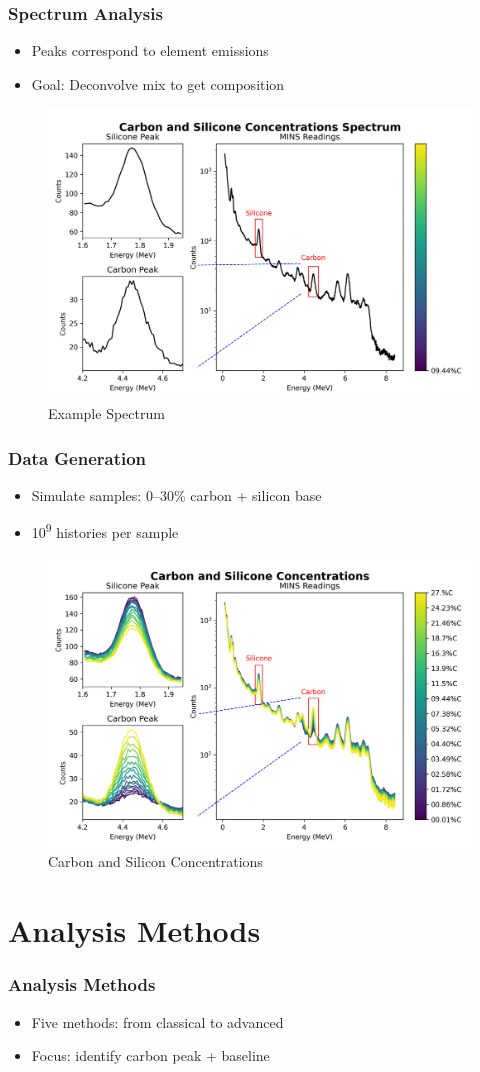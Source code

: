 \documentclass[xcolor=dvipsnames,envcountsect]{beamer}
\begin{document}
\begin{frame}
  \frametitle{Spectrum Analysis}
  \begin{itemize}
    \item Peaks correspond to element emissions
    \item Goal: Deconvolve mix to get composition
  \end{itemize}
  \begin{figure}
      \centering
      \includegraphics[width=.5\linewidth]{Figures/ExampleSpectrum.png}
      \caption{Example Spectrum}
      \label{fig:ExampleSpectrum}
  \end{figure}
\end{frame}

\begin{frame}
  \frametitle{Data Generation}
  \begin{itemize}
    \item Simulate samples: 0--30\% carbon + silicon base
    \item 10\textsuperscript{9} histories per sample
  \end{itemize}
  \begin{figure}
      \centering
      \includegraphics[width=.5\linewidth]{Figures/carbon_silicone_concentrations.png}
      \caption{Carbon and Silicon Concentrations}
      \label{fig:carbon_silicone_concentrations}
  \end{figure}
\end{frame}

\section{Analysis Methods}
\begin{frame}
  \frametitle{Analysis Methods}
  \begin{itemize}
    \item Five methods: from classical to advanced
    \item Focus: identify carbon peak + baseline
  \end{itemize}
\end{frame}
\end{document}
